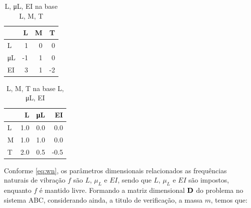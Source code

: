     
    \begin{table}[h!]
    \centering
    \caption{L, μL, EI na base L, M, T}
    {\begin{tabular}{lrrr}
\toprule
{} &  L &  M &  T \\
\midrule
L  &  1 &  0 &  0 \\
μL & -1 &  1 &  0 \\
EI &  3 &  1 & -2 \\
\bottomrule
\end{tabular}
}
    \label{}
    \end{table}
    

    
    
    \begin{table}[h!]
    \centering
    \caption{L, M, T na base L, μL, EI}
    {\begin{tabular}{lrrr}
\toprule
{} &    L &   μL &   EI \\
\midrule
L &  1.0 &  0.0 &  0.0 \\
M &  1.0 &  1.0 &  0.0 \\
T &  2.0 &  0.5 & -0.5 \\
\bottomrule
\end{tabular}
}
    \label{}
    \end{table}
    

    
    Conforme \ref{eq:wn}, os parâmetros dimensionais relacionados as
frequências naturais de vibração \(f\) são \(L\), \(\mu_L\) e \(EI\),
sendo que \(L\), \(\mu_L\) e \(EI\) são impostos, enquanto \(f\) é
mantido livre. Formando a matriz dimensional \(\bf D\) do problema no
sistema ABC, considerando ainda, a titulo de verificação, a massa \(m\),
temos que:

